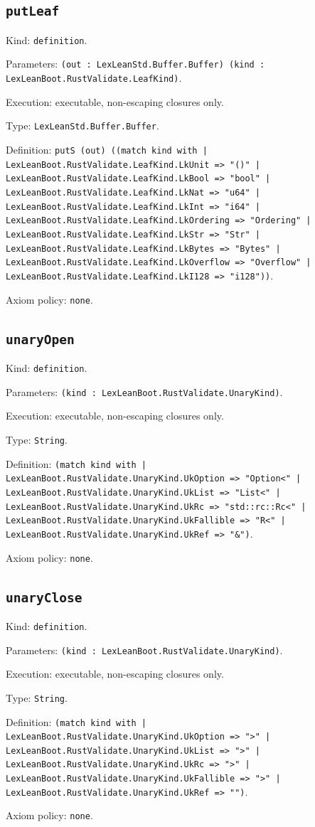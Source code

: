 \documentclass[11pt]{article}
\begin{document}
\subsection*{\texttt{putLeaf}}
\noindent Kind: \texttt{definition}.\par
\noindent Parameters: \texttt{(out : LexLeanStd.Buffer.Buffer) (kind : LexLeanBoot.RustValidate.LeafKind)}.\par
\noindent Execution: executable, non-escaping closures only.\par
\noindent Type: \texttt{LexLeanStd.Buffer.Buffer}.\par
\noindent Definition: \texttt{putS (out) ((match kind with | LexLeanBoot.RustValidate.LeafKind.LkUnit => "()" | LexLeanBoot.RustValidate.LeafKind.LkBool => "bool" | LexLeanBoot.RustValidate.LeafKind.LkNat => "u64" | LexLeanBoot.RustValidate.LeafKind.LkInt => "i64" | LexLeanBoot.RustValidate.LeafKind.LkOrdering => "Ordering" | LexLeanBoot.RustValidate.LeafKind.LkStr => "Str" | LexLeanBoot.RustValidate.LeafKind.LkBytes => "Bytes" | LexLeanBoot.RustValidate.LeafKind.LkOverflow => "Overflow" | LexLeanBoot.RustValidate.LeafKind.LkI128 => "i128"))}.\par
\noindent Axiom policy: \texttt{none}.\par
\subsection*{\texttt{unaryOpen}}
\noindent Kind: \texttt{definition}.\par
\noindent Parameters: \texttt{(kind : LexLeanBoot.RustValidate.UnaryKind)}.\par
\noindent Execution: executable, non-escaping closures only.\par
\noindent Type: \texttt{String}.\par
\noindent Definition: \texttt{(match kind with | LexLeanBoot.RustValidate.UnaryKind.UkOption => "Option<" | LexLeanBoot.RustValidate.UnaryKind.UkList => "List<" | LexLeanBoot.RustValidate.UnaryKind.UkRc => "std::rc::Rc<" | LexLeanBoot.RustValidate.UnaryKind.UkFallible => "R<" | LexLeanBoot.RustValidate.UnaryKind.UkRef => "\&")}.\par
\noindent Axiom policy: \texttt{none}.\par
\subsection*{\texttt{unaryClose}}
\noindent Kind: \texttt{definition}.\par
\noindent Parameters: \texttt{(kind : LexLeanBoot.RustValidate.UnaryKind)}.\par
\noindent Execution: executable, non-escaping closures only.\par
\noindent Type: \texttt{String}.\par
\noindent Definition: \texttt{(match kind with | LexLeanBoot.RustValidate.UnaryKind.UkOption => ">" | LexLeanBoot.RustValidate.UnaryKind.UkList => ">" | LexLeanBoot.RustValidate.UnaryKind.UkRc => ">" | LexLeanBoot.RustValidate.UnaryKind.UkFallible => ">" | LexLeanBoot.RustValidate.UnaryKind.UkRef => "")}.\par
\noindent Axiom policy: \texttt{none}.\par
\end{document}
